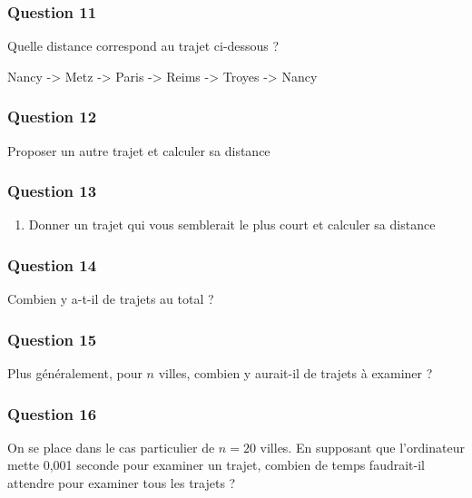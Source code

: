 \documentclass[
  paper=a4,
  ,captions=tableheading
]{scrartcl}
\providecommand{\tightlist}{%
  \setlength{\itemsep}{0pt}\setlength{\parskip}{0pt}}
\begin{document}
\hypertarget{question-11}{%
\subsubsection{Question 11}\label{question-11}}

Quelle distance correspond au trajet ci-dessous ?

Nancy -\textgreater{} Metz -\textgreater{} Paris -\textgreater{} Reims
-\textgreater{} Troyes -\textgreater{} Nancy

\hypertarget{question-12}{%
\subsubsection{Question 12}\label{question-12}}

Proposer un autre trajet et calculer sa distance

\hypertarget{question-13}{%
\subsubsection{Question 13}\label{question-13}}

\begin{enumerate}
\tightlist
\item
  Donner un trajet qui vous semblerait le plus court et calculer sa
  distance
\end{enumerate}

\hypertarget{question-14}{%
\subsubsection{Question 14}\label{question-14}}

Combien y a-t-il de trajets au total ?

\hypertarget{question-15}{%
\subsubsection{Question 15}\label{question-15}}

Plus généralement, pour \(n\) villes, combien y aurait-il de trajets à
examiner ?

\hypertarget{question-16}{%
\subsubsection{Question 16}\label{question-16}}

On se place dans le cas particulier de \(n=20\) villes. En supposant que
l'ordinateur mette 0,001 seconde pour examiner un trajet, combien de
temps faudrait-il attendre pour examiner tous les trajets ?
\end{document}

